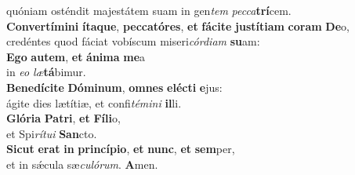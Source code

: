 \evenverse quóniam osténdit majestátem suam in gen\textit{tem} \textit{pec}\textit{ca}\textbf{trí}cem.\\
\oddverse \textbf{Con}\textbf{ver}\textbf{tí}\textbf{mi}\textbf{ni} \textbf{í}\textbf{ta}\textbf{que}, \textbf{pec}\textbf{ca}\textbf{tó}\textbf{res}, \textbf{et} \textbf{fá}\textbf{ci}\textbf{te} \textbf{ju}\textbf{stí}\textbf{ti}\textbf{am} \textbf{co}\textbf{ram} \textbf{De}o,~\*\\
\oddverse credéntes quod fáciat vobíscum miseri\textit{cór}\textit{di}\textit{am} \textbf{su}am:\\
\evenverse \textbf{E}\textbf{go} \textbf{au}\textbf{tem}, \textbf{et} \textbf{á}\textbf{ni}\textbf{ma} \textbf{me}a~\*\\
\evenverse in \textit{e}\textit{o} \textit{læ}\textbf{tá}bimur.\\
\oddverse \textbf{Be}\textbf{ne}\textbf{dí}\textbf{ci}\textbf{te} \textbf{Dó}\textbf{mi}\textbf{num}, \textbf{om}\textbf{nes} \textbf{e}\textbf{lé}\textbf{cti} \textbf{e}jus:~\*\\
\oddverse ágite dies lætítiæ, et confi\textit{té}\textit{mi}\textit{ni} \textbf{il}li.\\
\evenverse \textbf{Gló}\textbf{ri}\textbf{a} \textbf{Pa}\textbf{tri}, \textbf{et} \textbf{Fí}\textbf{li}o,~\*\\
\evenverse et Spi\textit{rí}\textit{tu}\textit{i} \textbf{San}cto.\\
\oddverse \textbf{Si}\textbf{cut} \textbf{e}\textbf{rat} \textbf{in} \textbf{prin}\textbf{cí}\textbf{pi}\textbf{o}, \textbf{et} \textbf{nunc}, \textbf{et} \textbf{sem}per,~\*\\
\oddverse et in sǽcula sæ\textit{cu}\textit{ló}\textit{rum}. \textbf{A}men.\\
